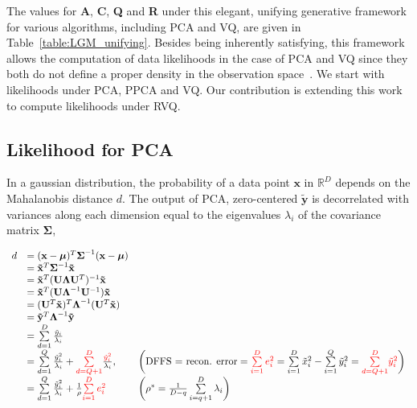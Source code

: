 The values for \textbf{A}, \textbf{C}, \textbf{Q} and \textbf{R} under this elegant, unifying generative framework for various algorithms, including PCA and VQ, are given in Table~\ref{table:LGM_unifying}.  Besides being inherently satisfying, this framework allows the computation of data likelihoods in the case of PCA and VQ since they both do not define a proper density in the observation space~\cite{1999_JNL_Gaussian_roweis}.  We start with likelihoods under PCA, PPCA and VQ.  Our contribution is extending this work to compute likelihoods under RVQ.

\subsection{Likelihood for PCA}
In a gaussian distribution, the probability of a data point $\mathbf{x}$ in $\mathbb{R}^D$ depends on the Mahalanobis distance $d$.  The output of PCA, zero-centered $\mathbf{\tilde{y}}$ is decorrelated with variances along each dimension equal to the eigenvalues $\lambda_i$ of the covariance matrix $\boldsymbol\Sigma$,


\begin{equation}
\begin{array}{lllllll}
d &= (\mathbf{x}-\boldsymbol\mu)^T\boldsymbol\Sigma^{-1}(\mathbf{x}-\boldsymbol\mu)\\
&=\mathbf{\tilde{x}}^T\boldsymbol\Sigma^{-1}\mathbf{\tilde{x}}\\
&=\mathbf{\tilde{x}}^T(\mathbf{U}\boldsymbol\Lambda\mathbf{U}^T)^{-1}\mathbf{\tilde{x}}\\
&=\mathbf{\tilde{x}}^T(\mathbf{U}\boldsymbol\Lambda^{-1}\mathbf{U}^{-1})\mathbf{\tilde{x}}\\
&=(\mathbf{U}^T\mathbf{\tilde{x}})^T\boldsymbol\Lambda^{-1}(\mathbf{U}^T\mathbf{\tilde{x}})	\\
&=\mathbf{\tilde{y}}^T\boldsymbol\Lambda^{-1}\mathbf{\tilde{y}}\\
&=\sum\limits_{d=1}^D \frac{\tilde{y}_i}{\lambda_i}\\
&=\sum\limits_{d=1}^Q \frac{\tilde{y}_i^2}{\lambda_i} + {\color{red}\sum\limits_{d=Q+1}^D} \frac{{\color{red}\tilde{y}_i^2}}{\lambda_i}, \ \ \  & \bigg(\textrm{DFFS = recon. error}={\color{red}\sum\limits_{i=1}^D e_i^2} = \sum\limits_{i=1}^D \tilde{x}_i^2 - \sum\limits_{i=1}^Q \tilde{y}_i^2= {\color{red}\sum\limits_{d=Q+1}^D} {\color{red}\tilde{y}_i^2}\bigg)\\
&=\sum\limits_{d=1}^Q \frac{\tilde{y}_i^2}{\lambda_i} + \frac{1}{\rho} {\color{red}\sum\limits_{i=1}^D e_i^2} \ \ \ & \bigg(\rho^* = \frac{1}{D-q}\sum\limits_{i=q+1}^D \lambda_i\bigg)\\
\end{array}
\label{Eqn:MoghaddamLikelihood}
\end{equation}


